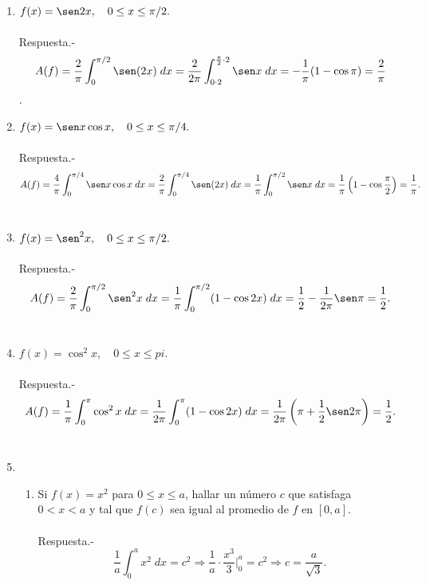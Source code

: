 \begin{enumerate}[\bfseries 1.]
\item $f(x)=\sen 2x,\quad 0\leq x \leq \pi/2.$\\\\
    Respuesta.-\; $$A(f) = \dfrac{2}{\pi}\int_0^{\pi/2}\sen(2x)\; dx =  \dfrac{2}{2\pi}\int_{0\cdot 2}^{\frac{\pi}{2}\cdot 2}  \sen x\; dx = -\dfrac{1}{\pi}(1 -\cos \pi) = \dfrac{2}{\pi}$$.\\

\item $f(x)=\sen x \cos x,\quad 0\leq x \leq \pi/4.$\\\\
    Respuesta.-\; $$A(f)=\dfrac{4}{\pi}\int_0^{\pi/4}\sen x \cos x\; dx = \dfrac{2}{\pi}\int_0^{\pi/4}\sen(2x)\; dx = \dfrac{1}{\pi}\int_0^{\pi/2}\sen x\; dx = \dfrac{1}{\pi}\left(1-\cos \dfrac{\pi}{2}\right) = \dfrac{1}{\pi}.$$\\

\item $f(x)=\sen^2 x, \quad 0\leq x \leq \pi/2.$\\\\
    Respuesta.-\; $$A(f) = \dfrac{2}{\pi}\int_0^{\pi/2} \sen^2 x \; dx = \dfrac{1}{\pi}\int_0^{\pi/2} (1-\cos 2x)\; dx = \dfrac{1}{2} - \dfrac{1}{2\pi}\sen \pi = \dfrac{1}{2}.$$\\

\item $f(x)=\cos^2 x, \quad 0\leq x \leq pi.$\\\\
    Respuesta.-\; $$A(f) = \dfrac{1}{\pi}\int_0^{\pi}\cos^2 x\; dx = \dfrac{1}{2\pi}\int_0^\pi (1-\cos 2x)\; dx = \dfrac{1}{2\pi}\left(\pi + \dfrac{1}{2}\sen 2\pi\right) = \dfrac{1}{2}.$$\\

\item 
    \begin{enumerate}[\bfseries (a)]

	\item Si $f(x)=x^2$ para $0\leq x \leq a$, hallar un número $c$ que satisfaga $0<x<a$ y tal que $f(c)$ sea igual al promedio de $f$ en $[0,a].$\\\\
	    Respuesta.-\; $$\dfrac{1}{a}\int_0^a x^2\; dx = c^2 \Longrightarrow \dfrac{1}{a}\cdot \dfrac{x^3}{3}\bigg|_0^a = c^2 \Longrightarrow c = \dfrac{a}{\sqrt{3}}.$$\\


\end{enumerate}
\end{enumerate}
